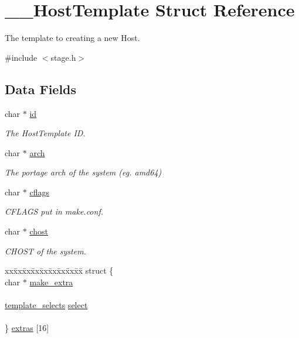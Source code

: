 \hypertarget{struct_____host_template}{}\section{\+\_\+\+\_\+\+Host\+Template Struct Reference}
\label{struct_____host_template}


The template to creating a new Host.  




{\ttfamily \#include $<$stage.\+h$>$}

\subsection*{Data Fields}
\begin{DoxyCompactItemize}
\item 
char $\ast$ \mbox{\hyperlink{struct_____host_template_a6c8b983339976e4622f62d82c0b4fbf1}{id}}
\begin{DoxyCompactList}\small\item\em The Host\+Template ID. \end{DoxyCompactList}\item 
char $\ast$ \mbox{\hyperlink{struct_____host_template_a6052713001eb237749beb250899b09ba}{arch}}
\begin{DoxyCompactList}\small\item\em The portage arch of the system (eg. amd64) \end{DoxyCompactList}\item 
char $\ast$ \mbox{\hyperlink{struct_____host_template_a1e87b79a1795d0e02a913327e0d46878}{cflags}}
\begin{DoxyCompactList}\small\item\em C\+F\+L\+A\+GS put in make.\+conf. \end{DoxyCompactList}\item 
char $\ast$ \mbox{\hyperlink{struct_____host_template_a5ed1986b1774d3836e5f5f5d769de82f}{chost}}
\begin{DoxyCompactList}\small\item\em C\+H\+O\+ST of the system. \end{DoxyCompactList}\item 
\begin{tabbing}
xx\=xx\=xx\=xx\=xx\=xx\=xx\=xx\=xx\=\kill
struct \{\\
\>char $\ast$ \mbox{\hyperlink{struct_____host_template_a7225136c3e9e14ca6a469fedb2cfd22a}{make\_extra}}\\
\>\\
\>\mbox{\hyperlink{stage_8h_a3ba89b32a5d51c086fa5dfa12e879f06}{template\_selects}} \mbox{\hyperlink{struct_____host_template_ad1f4c7a1e25592181f63018195b4ff54}{select}}\\
\>\\
\} \mbox{\hyperlink{struct_____host_template_aff5d3ff3e82e08c0535756ab18e6b545}{extras}} \mbox{[}16\mbox{]}\\


\end{tabbing}
\end{DoxyCompactItemize}
